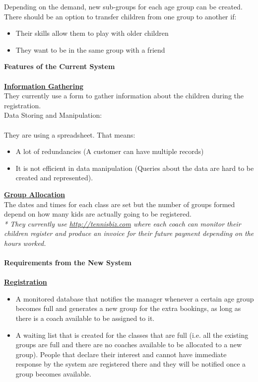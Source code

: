 \documentclass{l3proj}
\begin{document}
Depending on the demand, new sub-groups for each age group can be created. There should be an option to transfer children from one group to another if:
\begin{itemize}
\item Their skills allow them to play with older children
\item They want to be in the same group with a friend
\end{itemize}
\textbf{\Large{Features of the Current System}}\\
\\\textbf{\underline{Information Gathering}}\\
They currently use a form to gather information about the children during the registration.\\
Data Storing and Manipulation:\\
\\They are using a spreadsheet. That means:\\
\begin{itemize}
	\item A lot of redundancies (A customer can have multiple records)
	\item It is not efficient in data manipulation (Queries about the data are hard to be created and represented).
\end{itemize}
\textbf{\underline{Group Allocation}}\\
The dates and times for each class are set but the number of groups formed depend on how many kids are actually going to be registered.\\
\emph{* They currently use \url{http://tennisbiz.com} where each coach can monitor their children register and produce an invoice for their future payment depending on the hours worked.}\\
\\ \textbf{\Large{Requirements from the New System}}\\
\\ \textbf{\underline{Registration}}
	\begin{itemize}
		\item A monitored database that notifies the manager whenever a certain age group becomes full and generates a new group for the extra bookings, as long as there is a coach available to be assigned to it.
		\item A waiting list that is created for the classes that are full (i.e. all the existing groups are full and there are no coaches available to be allocated to a new group). People that declare their interest and cannot have immediate response by the system are registered there and they will be notified once a group becomes available.
	\end{itemize}
\end{document}
